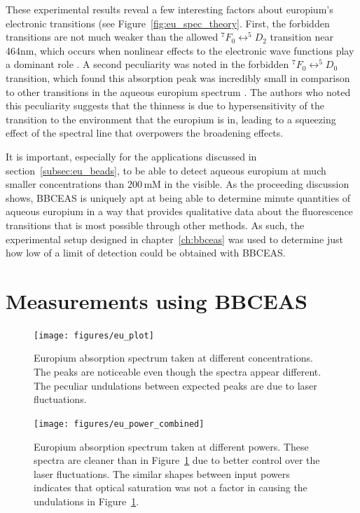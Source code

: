 These experimental results reveal a few interesting factors about europium's
electronic transitions (see Figure~\ref{fig:eu_spec_theory}. First, the
forbidden transitions are not much weaker than the allowed $^7F_0
\leftrightarrow ^5D_2$ transition near 464nm, which occurs when nonlinear
effects to the electronic wave functions play a dominant role
\cite{Walsh:2005te}. A second peculiarity was noted in the forbidden $^7F_0
\leftrightarrow ^5D_0$ transition, which found this absorption peak was
incredibly small in comparison to other transitions in the aqueous europium
spectrum \cite{Sawada:1979vca}. The authors who noted this peculiarity suggests
that the thinness is due to hypersensitivity of the transition to the
environment that the europium is in, leading to a squeezing effect of the
spectral line that overpowers the broadening effects.

It is important, especially for the applications discussed in
section~\ref{subsec:eu_beads}, to be able to detect aqueous europium at much
smaller concentrations than 200\,mM in the visible. As the proceeding
discussion shows, \ac{BBCEAS} is uniquely apt at being able to determine minute
quantities of aqueous europium in a way that provides qualitative data about
the fluorescence transitions that is most possible through other methods. As
such, the experimental setup designed in chapter~\ref{ch:bbceas} was used to
determine just how low of a limit of detection could be obtained with
\ac{BBCEAS}.



\section{Measurements using BBCEAS}\label{sec:eu_measurements}

\begin{figure}
\begin{center}
\texttt{[image: figures/eu\_plot]}
\end{center}
\caption{Europium absorption spectrum taken at different concentrations. The peaks are noticeable even though the spectra appear different. The peculiar undulations between expected peaks are due to laser fluctuations.}
\label{fig:eu_conc}
\end{figure}

\begin{figure}
\begin{center}
\texttt{[image: figures/eu\_power\_combined]}
\end{center}
\caption{Europium absorption spectrum taken at different powers. These spectra are cleaner than in Figure~\ref{fig:eu_conc} due to better control over the laser fluctuations. The similar shapes between input powers indicates that optical saturation was not a factor in causing the undulations in Figure~\ref{fig:eu_conc}.}
\label{fig:eu_power}
\end{figure}

